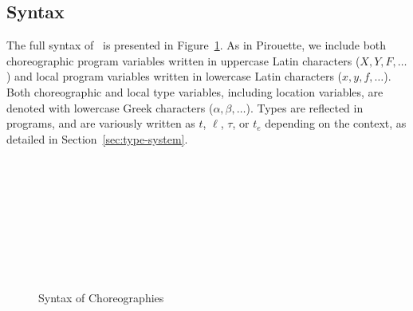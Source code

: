\subsection{Syntax}
\label{sec:syntax}
The full syntax of \langname~is presented in Figure~\ref{fig:abstract-syntax}.
As in Pirouette, we include both choreographic program variables written in uppercase Latin characters ($X,Y,F,\ldots$) and local program variables written in lowercase Latin characters ($x,y,f,\ldots$).
Both choreographic and local type variables, including location variables, are denoted with lowercase Greek characters ($\alpha,\beta,\ldots$).
Types are reflected in programs, and are variously written as $t$, $\ell$, $\tau$, or $t_e$ depending on the context, as detailed in Section~\ref{sec:type-system}.

\begin{figure}[h]
  \begin{syntax}
    \\

    \alternative{\Left}
    \alternative{\Right}


        \\
     \\
     \\
    \\
    \\
    \\

  \end{syntax}

  \caption{Syntax of Choreographies}
  \label{fig:abstract-syntax}
\end{figure}

